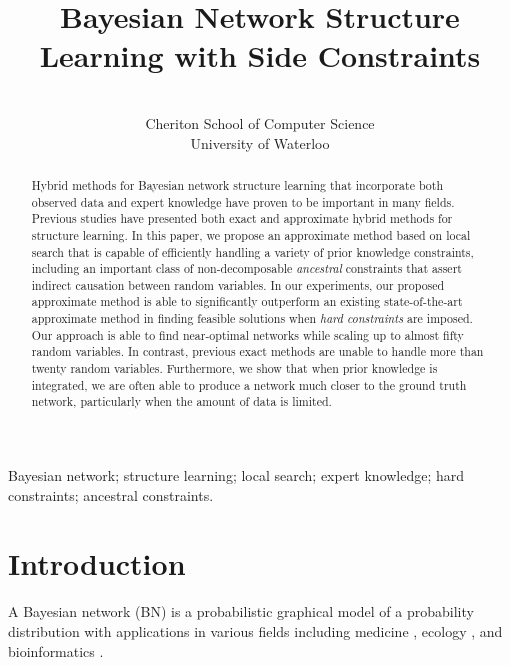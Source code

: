 \documentclass[twoside,11pt]{article}
\title{ Bayesian Network Structure Learning with Side Constraints }
\author{\Name{Andrew C. Li} \Email{acli@uwaterloo.ca}\and
   \Name{Peter van Beek} \Email{vanbeek@cs.uwaterloo.ca}\\
   \addr 	Cheriton School of Computer Science  \\
	University of Waterloo \\ }
\begin{document}
\maketitle
\raggedbottom

\begin{abstract}%
Hybrid methods for Bayesian network structure learning that incorporate
both observed data and expert knowledge have proven to be important in
many fields. Previous studies have presented both exact and approximate
hybrid methods for structure learning. In this paper, we propose an
approximate method based on local search that is capable of efficiently
handling a variety of prior knowledge constraints, including an
important class of non-decomposable \emph{ancestral} constraints that
assert indirect causation between random variables. In our experiments,
our proposed approximate method is able to significantly outperform an
existing state-of-the-art approximate method in finding feasible solutions
when \emph{hard constraints} are imposed. Our approach is able to find
near-optimal networks while scaling up to almost fifty random variables.
In contrast,
previous exact methods are unable to handle more than twenty
random variables. Furthermore, we show that when prior knowledge is
integrated, we are often able to produce a network much closer to the
ground truth network, particularly when the amount of data is limited.
\end{abstract}

\begin{keywords}
Bayesian network; structure learning; local search; expert knowledge; hard constraints; ancestral constraints.
\end{keywords}

%
%
%
%
%
\section{Introduction}

A Bayesian network (BN) is a probabilistic graphical model of a probability distribution
with applications in various fields including medicine \citep{Flores2011}, ecology \citep{Pollino2007},
and bioinformatics \citep{Friedman2000}. 
\end{document}
